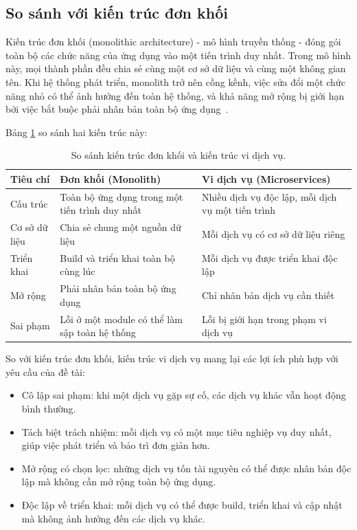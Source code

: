 \documentclass[../BTL.tex]{subfiles}
\begin{document}
\subsection{So sánh với kiến trúc đơn khối}
\label{section:1.2.2}

Kiến trúc đơn khối (monolithic architecture) - mô hình truyền thống - đóng gói toàn bộ các chức năng của ứng dụng vào một tiến trình duy nhất. Trong mô hình này, mọi thành phần đều chia sẻ cùng một cơ sở dữ liệu và cùng một không gian tên. Khi hệ thống phát triển, monolith trở nên cồng kềnh, việc sửa đổi một chức năng nhỏ có thể ảnh hưởng đến toàn hệ thống, và khả năng mở rộng bị giới hạn bởi việc bắt buộc phải nhân bản toàn bộ ứng dụng~\cite{newman2021building}.

Bảng \ref{tab:monolith-vs-microservices} so sánh hai kiến trúc này:

\begin{table}[ht]
\centering
\begin{tabularx}{\textwidth}{@{}p{3.2cm}XX@{}}
\toprule
Tiêu chí & Đơn khối (Monolith) & Vi dịch vụ (Microservices) \\
\midrule
Cấu trúc & Toàn bộ ứng dụng trong một tiến trình duy nhất & Nhiều dịch vụ độc lập, mỗi dịch vụ một tiến trình \\
Cơ sở dữ liệu & Chia sẻ chung một nguồn dữ liệu & Mỗi dịch vụ có cơ sở dữ liệu riêng \\
Triển khai & Build và triển khai toàn bộ cùng lúc & Mỗi dịch vụ được triển khai độc lập \\
Mở rộng & Phải nhân bản toàn bộ ứng dụng & Chỉ nhân bản dịch vụ cần thiết \\
Sai phạm & Lỗi ở một module có thể làm sập toàn hệ thống & Lỗi bị giới hạn trong phạm vi dịch vụ \\
\bottomrule
\end{tabularx}
\caption{So sánh kiến trúc đơn khối và kiến trúc vi dịch vụ.}
\label{tab:monolith-vs-microservices}
\end{table}

So với kiến trúc đơn khối, kiến trúc vi dịch vụ mang lại các lợi ích phù hợp với yêu cầu của đề tài:
\begin{itemize}
    \item Cô lập sai phạm: khi một dịch vụ gặp sự cố, các dịch vụ khác vẫn hoạt động bình thường.
    \item Tách biệt trách nhiệm: mỗi dịch vụ có một mục tiêu nghiệp vụ duy nhất, giúp việc phát triển và bảo trì đơn giản hơn.
    \item Mở rộng có chọn lọc: những dịch vụ tốn tài nguyên có thể được nhân bản độc lập mà không cần mở rộng toàn bộ ứng dụng.
    \item Độc lập về triển khai: mỗi dịch vụ có thể được build, triển khai và cập nhật mà không ảnh hưởng đến các dịch vụ khác.
\end{itemize}
\end{document}

